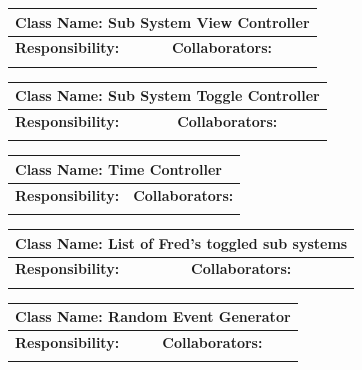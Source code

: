 \documentclass[]{article}
\begin{document}
	\begin{table}[ht]
		\centering
		\begin{tabular}{|p{5cm}|p{5cm}|}
		\hline 
		 \multicolumn{2}{|l|}{\textbf{Class Name: Sub System View Controller}} \\
		\hline
		\textbf{Responsibility:} & \textbf{Collaborators:} \\
		\hline
		\vspace{1in} & \\
		\hline
		\end{tabular}
	\end{table}
	\begin{table}[ht]
		\centering
		\begin{tabular}{|p{5cm}|p{5cm}|}
		\hline 
		 \multicolumn{2}{|l|}{\textbf{Class Name: Sub System Toggle Controller}} \\
		\hline
		\textbf{Responsibility:} & \textbf{Collaborators:} \\
		\hline
		\vspace{1in} & \\
		\hline
		\end{tabular}
	\end{table}
	\begin{table}[ht]
		\centering
		\begin{tabular}{|p{5cm}|p{5cm}|}
		\hline 
		 \multicolumn{2}{|l|}{\textbf{Class Name: Time Controller}} \\
		\hline
		\textbf{Responsibility:} & \textbf{Collaborators:} \\
		\hline
		\vspace{1in} & \\
		\hline
		\end{tabular}
	\end{table}
	\begin{table}[ht]
		\centering
		\begin{tabular}{|p{5cm}|p{5cm}|}
		\hline 
		 \multicolumn{2}{|l|}{\textbf{Class Name: List of Fred's toggled sub systems}} \\
		\hline
		\textbf{Responsibility:} & \textbf{Collaborators:} \\
		\hline
		\vspace{1in} & \\
		\hline
		\end{tabular}
	\end{table}
	\begin{table}[ht]
		\centering
		\begin{tabular}{|p{5cm}|p{5cm}|}
		\hline 
		 \multicolumn{2}{|l|}{\textbf{Class Name: Random Event Generator}} \\
		\hline
		\textbf{Responsibility:} & \textbf{Collaborators:} \\
		\hline
		\vspace{1in} & \\
		\hline
		\end{tabular}
	\end{table}
\end{document}
